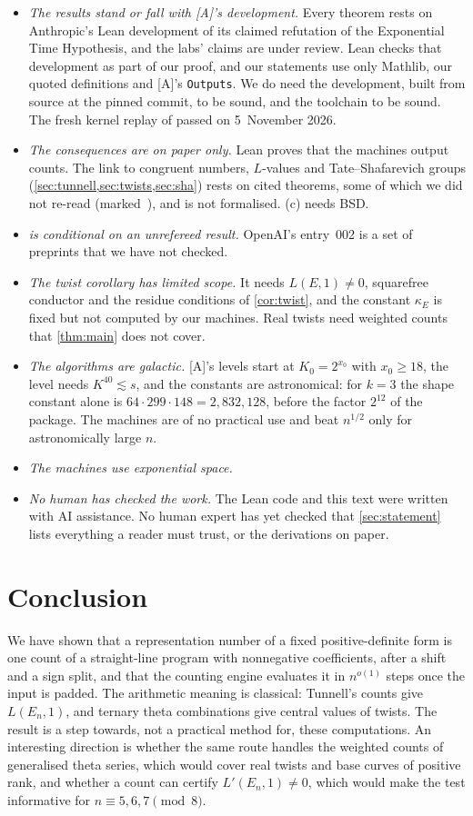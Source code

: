 \documentclass[10pt]{amsart}
\theoremstyle{plain}
\theoremstyle{definition}
\theoremstyle{remark}
\numberwithin{equation}{section}
\newcommand{\A}{\textup{[A]}}
\newcommand{\nr}{\dag}%
\begin{document}
\begin{itemize}
\item \emph{The results stand or fall with \A's development.} Every theorem rests on Anthropic's Lean development
of its claimed refutation of the Exponential Time Hypothesis, and the labs' claims are under review. Lean checks
that development as part of our proof, and our statements use only Mathlib, our quoted definitions and \A's
\texttt{Outputs}. We do need the development, built from source at the pinned commit, to be sound, and the
toolchain to be sound. The fresh kernel replay of  passed on 5~November 2026.
\item \emph{The consequences are on paper only.} Lean proves that the machines output counts. The link to
congruent numbers, $L$-values and Tate--Shafarevich groups (\cref{sec:tunnell,sec:twists,sec:sha}) rests on cited
theorems, some of which we did not re-read (marked~\nr), and is not formalised. (c) needs BSD.
\item \emph{ is conditional on an unrefereed result.} OpenAI's entry~002 is a set of preprints that
we have not checked.
\item \emph{The twist corollary has limited scope.} It needs $L(E,1)\ne0$, squarefree conductor and the residue
conditions of \cref{cor:twist}, and the constant $\kappa_E$ is fixed but not computed by our machines. Real twists
need weighted counts that \cref{thm:main} does not cover.
\item \emph{The algorithms are galactic.} \A's levels start at $K_0=2^{x_0}$ with $x_0\ge18$, the level needs
$K^{40}\lesssim s$, and the constants are astronomical: for $k=3$ the shape constant alone is
$64\cdot299\cdot148=2{,}832{,}128$, before the factor $2^{12}$ of the package. The machines are of no practical use and
beat $n^{1/2}$ only for astronomically large $n$.
\item \emph{The machines use exponential space.}
\item \emph{No human has checked the work.} The Lean code and this text were written with AI assistance. No human
expert has yet checked that \cref{sec:statement} lists everything a reader must trust, or the derivations on paper.
\end{itemize}

\section{Conclusion}\label{sec:conclusion}
We have shown that a representation number of a fixed positive-definite form is one count of a straight-line
program with nonnegative coefficients, after a shift and a sign split, and that the counting engine evaluates it in
$n^{o(1)}$ steps once the input is padded. The arithmetic meaning is classical: Tunnell's counts give $L(E_n,1)$, and
ternary theta combinations give central values of twists. The result is a step towards, not a practical method for,
these computations. An interesting direction is whether the same route handles the weighted counts of
generalised theta series, which would cover real twists and base curves of positive rank, and whether a count
can certify $L'(E_n,1)\ne0$, which would make the test informative for $n\equiv5,6,7\pmod8$.
\end{document}
